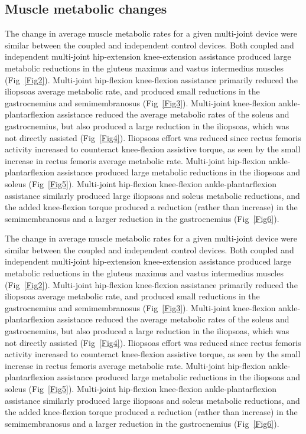 \documentclass[10pt,letterpaper]{article}
\begin{document}
\subsection*{Muscle metabolic changes}
The change in average muscle metabolic rates for a given multi-joint device were similar between the coupled and independent control devices. Both coupled and independent multi-joint hip-extension knee-extension assistance produced large metabolic reductions in the gluteus maximus and vastus intermedius muscles (Fig~\ref{Fig2}). Multi-joint hip-flexion knee-flexion assistance primarily reduced the iliopsoas average metabolic rate, and produced small reductions in the gastrocnemius and semimembranosus (Fig~\ref{Fig3}). Multi-joint knee-flexion ankle-plantarflexion assistance reduced the average metabolic rates of the soleus and gastrocnemius, but also produced a large reduction in the iliopsoas, which was not directly assisted (Fig~\ref{Fig4}). Iliopsoas effort was reduced since rectus femoris activity increased to counteract knee-flexion assistive torque, as seen by the small increase in rectus femoris average metabolic rate. Multi-joint hip-flexion ankle-plantarflexion assistance produced large metabolic reductions in the iliopsoas and soleus (Fig~\ref{Fig5}). Multi-joint hip-flexion knee-flexion ankle-plantarflexion assistance similarly produced large iliopsoas and soleus metabolic reductions, and the added knee-flexion torque produced a reduction (rather than increase) in the semimembranosus and a larger reduction in the gastrocnemius (Fig~\ref{Fig6}).

The change in average muscle metabolic rates for a given multi-joint device were similar between the coupled and independent control devices. Both coupled and independent multi-joint hip-extension knee-extension assistance produced large metabolic reductions in the gluteus maximus and vastus intermedius muscles (Fig~\ref{Fig2}). Multi-joint hip-flexion knee-flexion assistance primarily reduced the iliopsoas average metabolic rate, and produced small reductions in the gastrocnemius and semimembranosus (Fig~\ref{Fig3}). Multi-joint knee-flexion ankle-plantarflexion assistance reduced the average metabolic rates of the soleus and gastrocnemius, but also produced a large reduction in the iliopsoas, which was not directly assisted (Fig~\ref{Fig4}). Iliopsoas effort was reduced since rectus femoris activity increased to counteract knee-flexion assistive torque, as seen by the small increase in rectus femoris average metabolic rate. Multi-joint hip-flexion ankle-plantarflexion assistance produced large metabolic reductions in the iliopsoas and soleus (Fig~\ref{Fig5}). Multi-joint hip-flexion knee-flexion ankle-plantarflexion assistance similarly produced large iliopsoas and soleus metabolic reductions, and the added knee-flexion torque produced a reduction (rather than increase) in the semimembranosus and a larger reduction in the gastrocnemius (Fig~\ref{Fig6}).
\end{document}
